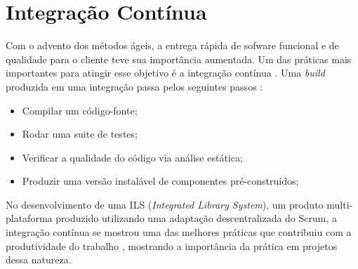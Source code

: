 \section{Integração Contínua}

Com o advento dos métodos ágeis, a entrega rápida de sofware funcional e de qualidade para o cliente teve sua importância aumentada. Um das práticas mais importantes para atingir esse objetivo é a integração contínua \cite{continuous-integration}. Uma \textit{build} produzida em uma integração passa pelos seguintes passos \cite{continuous-integration}:
\begin{itemize}
\item Compilar um código-fonte;
\item Rodar uma suite de testes; 
\item Verificar a qualidade do código via análise estática;
\item Produzir uma versão instalável de componentes pré-construídos; 
\end{itemize}
No desenvolvimento de uma ILS (\textit{Integrated Library System}), um produto multi-plataforma produzido utilizando uma adaptação descentralizada do Scrum, a integração contínua se mostrou uma das melhores práticas que contribuiu com a produtividade do trabalho \cite{sutherland}, mostrando a importância da prática em projetos dessa natureza.
